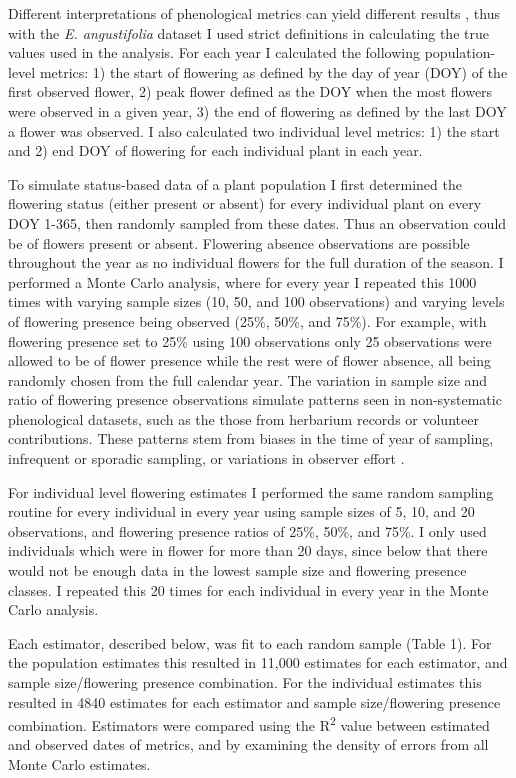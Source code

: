 Different interpretations of phenological metrics can yield different results \citep{renzi2019}, thus with the \textit{E. angustifolia} dataset I used strict definitions in calculating the true values used in the analysis. For each year I calculated the following population-level metrics: 1) the start of flowering as defined by the day of year (DOY) of the first observed flower, 2) peak flower defined as the DOY when the most flowers were observed in a given year, 3) the end of flowering as defined by the last DOY a flower was observed. I also calculated two individual level metrics: 1) the start and 2) end DOY of flowering for each individual plant in each year.

To simulate status-based data of a plant population I first determined the flowering status (either present or absent) for every individual plant on every DOY 1-365, then randomly sampled from these dates. Thus an observation could be of flowers present or absent. Flowering absence observations are possible throughout the year as no individual flowers for the full duration of the season. I performed a Monte Carlo analysis, where for every year I repeated this 1000 times with varying sample sizes (10, 50, and 100 observations) and varying levels of flowering presence being observed (25\%, 50\%, and 75\%). For example, with flowering presence set to 25\% using 100 observations only 25 observations were allowed to be of flower presence while the rest were of flower absence, all being randomly chosen from the full calendar year. The variation in sample size and ratio of flowering presence observations simulate patterns seen in non-systematic phenological datasets, such as the those from herbarium records or volunteer contributions. These patterns stem from biases in the time of year of sampling, infrequent or sporadic sampling, or variations in observer effort \citep{dickinson2010, willis2017, daru2018}. 

For individual level flowering estimates I performed the same random sampling routine for every individual in every year using sample sizes of 5, 10, and 20 observations, and flowering presence ratios of 25\%, 50\%, and 75\%. I only used individuals which were in flower for more than 20 days, since below that there would not be enough data in the lowest sample size and flowering presence classes. I repeated this 20 times for each individual in every year in the Monte Carlo analysis. 

Each estimator, described below, was fit to each random sample (Table 1). For the population estimates this resulted in 11,000 estimates for each estimator, and sample size/flowering presence combination. For the individual estimates this resulted in 4840 estimates for each estimator and sample size/flowering presence combination. Estimators were compared using the R\textsuperscript{2} value between estimated and observed dates of metrics, and by examining the density of errors from all Monte Carlo estimates.

